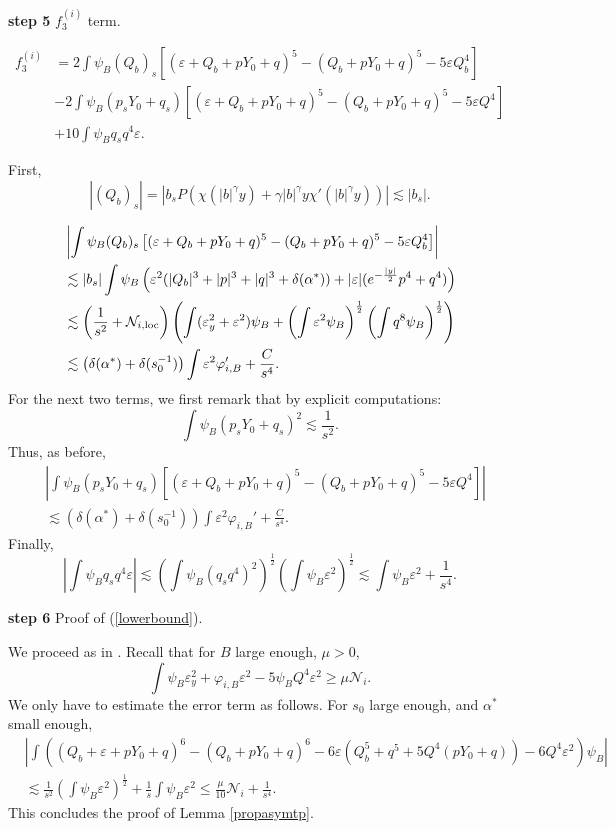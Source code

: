 \documentclass[11pt,a4paper,reqno]{amsart}
\theoremstyle{remark}
\numberwithin{equation}{section}
\def\fref#1{{\rm (\ref{#1})}}
\def\e{\varepsilon}
\def\fref#1{{\rm (\ref{#1})}}
\def\Yz{Y_0}
\begin{document}
{\bf step 5} $f_3^{(i)}$ term.

\begin{align*}
f_3^{(i)}&= 2  \int \psi_B(Q_b)_{s} \left[(\varepsilon+Q_b+p\Yz+q)^5 - (Q_b+p\Yz+q)^5 - 5 \varepsilon Q_b^4\right]\\
& - 2 \int \psi_B (p_s \Yz+ q_s) \left[(\varepsilon+Q_b+p\Yz+q)^5  -(Q_b+p\Yz+q)^5 - 5 \varepsilon Q^4\right]\\
&+ 10 \int \psi_B q_s q^4 \e.
\end{align*}

First,
$$
|(Q_b)_s|=\left|b_s P \left( \chi(|b|^{\gamma} y) + \gamma |b|^\gamma y \chi'(|b|^{\gamma} y)\right)\right|\lesssim |b_s| .
$$

\begin{align*}
&\left| \int \psi_B(Q_b)_{s} \left[(\varepsilon+Q_b+p\Yz+q)^5 - (Q_b+p\Yz+q)^5 - 5 \varepsilon Q_b^4\right]\right| \\
  & \lesssim  |b_s|\int\psi_B \left(\e^2(|Q_b|^3+|p|^3+|q|^3+\delta(\alpha^*))  +|\e| (e^{-\frac {|y|}2} p^4+q^4) \right)\\
& \lesssim    \left(\frac 1{s^2} +  \mathcal{N}_{i,\rm loc}\right)  \left( \int (\e_y^2+\varepsilon^2)  \psi_{B} + \left( \int \e^2 \psi_B \right)^{\frac 12 } \left( \int q^8\psi_B \right)^{\frac 12}\right)\\
& \lesssim  \left(\delta(\alpha^*) + \delta(s_0^{-1}) \right) \int \varepsilon^2   \varphi_{i,B}' +\frac C{s^4}.
\end{align*}
For the next two terms, we first remark that by explicit computations:
$$
\int \psi_B (p_s \Yz+ q_s)^2\lesssim \frac 1{s^2}.
$$
Thus, as before,
\begin{align*}
& \left|\int \psi_B (p_s \Yz+ q_s) \left[(\varepsilon+Q_b+p\Yz+q)^5  -(Q_b+p\Yz+q)^5 - 5 \varepsilon Q^4\right] \right| \\
& \lesssim    \left(\delta(\alpha^*) + \delta(s_0^{-1}) \right) \int \varepsilon^2   \varphi_{i,B}' +\frac C{s^4}.
\end{align*}
Finally,
$$
\left|  \int \psi_B q_s q^4 \e \right| \lesssim \left( \int \psi_B (q_s q^4)^2 \right)^{\frac 12}
\left( \int \psi_B  \e^2 \right)^{\frac 12}\lesssim \int \psi_B  \e^2 +\frac 1{s^4}.
$$
\medskip



{\bf step 6} Proof of \fref{lowerbound}.

We proceed as in \cite{MMR1}. 
Recall that for $B$ large enough, $\mu>0$,
$$\int \psi_B\varepsilon_y^2 + \varphi_{i,B}\varepsilon^2- 5 \psi_B Q^4\e^2 \geq \mu \mathcal N_i.$$ 
We only have to estimate the error term as follows. 
For $s_0$ large enough, and $\alpha^*$ small enough,
\begin{align*}
& \left| \int \left( (Q_b{+}\e{+}p\Yz{+}q)^6 {-} (Q_b{+}p\Yz{+}q)^6  
{-} 6 \e (Q_b^5 {+} q^5 {+} 5 Q^4(p\Yz{+}q)) {-} 6 Q^4 \e^2\right) \psi_B\right| \\
& \lesssim
\frac 1 {s^2}\left( \int \psi_B  \e^2 \right)^{\frac 12}+
\frac 1s \int \psi_B  \e^2 \leq \frac \mu {10} \mathcal N_i+ \frac 1 {s^4} .
\end{align*}
This concludes the proof of Lemma \ref{propasymtp}.
 
\end{document}
